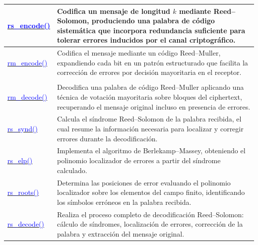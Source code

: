 \begin{longtable}{|>{\centering\arraybackslash}m{4.7cm}|>{\arraybackslash}m{11.9cm}|}
 \\
\hline
\href{https://github.com/camilo-home/hqc128/blob/30e4dd2663a1562349b38cff338aa3e4845d5bf5/hqc128.py#L154}{\textcolor{blue}{rs\_encode()}} &
Codifica un mensaje de longitud $k$ mediante Reed–Solomon, produciendo una palabra de código sistemática que incorpora redundancia suficiente para tolerar errores inducidos por el canal criptográfico.
 \\
\hline
\href{https://github.com/camilo-home/hqc128/blob/30e4dd2663a1562349b38cff338aa3e4845d5bf5/hqc128.py#L163}{\textcolor{blue}{rm\_encode()}} &
Codifica el mensaje mediante un código Reed–Muller, expandiendo cada bit en un patrón estructurado que facilita la corrección de errores por decisión mayoritaria en el receptor.
 \\
\hline
\multicolumn{2}{|c|}{\textbf{Decodificadores de corrección de errores}} \\
\hline
\href{https://github.com/camilo-home/hqc128/blob/30e4dd2663a1562349b38cff338aa3e4845d5bf5/hqc128.py#L189}{\textcolor{blue}{rm\_decode()}} &
Decodifica una palabra de código Reed–Muller aplicando una técnica de votación mayoritaria sobre bloques del ciphertext, recuperando el mensaje original incluso en presencia de errores.
 \\
\hline
\href{https://github.com/camilo-home/hqc128/blob/30e4dd2663a1562349b38cff338aa3e4845d5bf5/hqc128.py#L217}{\textcolor{blue}{rs\_synd()}} &
Calcula el síndrome Reed–Solomon de la palabra recibida, el cual resume la información necesaria para localizar y corregir errores durante la decodificación.
 \\
\hline
\href{https://github.com/camilo-home/hqc128/blob/30e4dd2663a1562349b38cff338aa3e4845d5bf5/hqc128.py#L232}{\textcolor{blue}{rs\_elp()}} &
Implementa el algoritmo de Berlekamp–Massey, obteniendo el polinomio localizador de errores a partir del síndrome calculado.
 \\
\hline
\href{https://github.com/camilo-home/hqc128/blob/30e4dd2663a1562349b38cff338aa3e4845d5bf5/hqc128.py#L264}{\textcolor{blue}{rs\_roots()}} &
Determina las posiciones de error evaluando el polinomio localizador sobre los elementos del campo finito, identificando los símbolos erróneos en la palabra recibida.
 \\
\hline
\href{https://github.com/camilo-home/hqc128/blob/30e4dd2663a1562349b38cff338aa3e4845d5bf5/hqc128.py#L283}{\textcolor{blue}{rs\_decode()}} &
Realiza el proceso completo de decodificación Reed–Solomon: cálculo de síndromes, localización de errores, corrección de la palabra y extracción del mensaje original.

\end{longtable}
